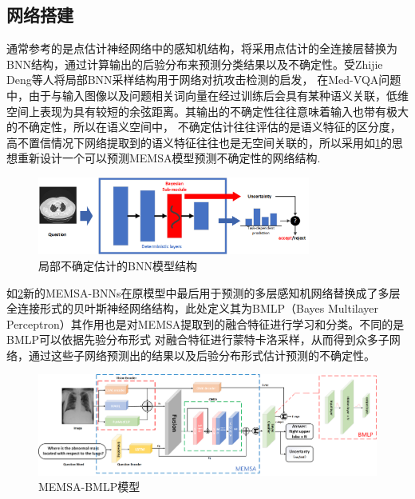 \subsection{网络搭建}
通常参考的是点估计神经网络中的感知机结构，将采用点估计的全连接层替换为BNN结构，通过计算输出的后验分布来预测分类结果以及不确定性。受Zhijie Deng等人\cite{deng2021libre}将局部BNN采样结构用于网络对抗攻击检测的启发，
在Med-VQA问题中，由于与输入图像以及问题相关词向量在经过训练后会具有某种语义关联，低维空间上表现为具有较短的余弦距离。其输出的不确定性往往意味着输入也带有极大的不确定性，所以在语义空间中，
不确定估计往往评估的是语义特征的区分度，高不置信情况下网络提取到的语义特征往往也是无空间关联的，所以采用如\ref{bnn-sublayer}的思想重新设计一个可以预测MEMSA模型预测不确定性的网络结构.
\begin{figure}[htbp]
	\centering	
	\includegraphics[width=0.8\textwidth]{Fig/myfig/chapter4/bnn-sublayer.png}  %
	\caption{\label{bnn-sublayer}局部不确定估计的BNN模型结构} 
\end{figure}

如\ref{memsabnns}新的MEMSA-BNNs在原模型中最后用于预测的多层感知机网络替换成了多层全连接形式的贝叶斯神经网络结构，此处定义其为BMLP（Bayes Multilayer Perceptron）其作用也是对MEMSA提取到的融合特征进行学习和分类。不同的是BMLP可以依据先验分布形式
对融合特征进行蒙特卡洛采样，从而得到众多子网络，通过这些子网络预测出的结果以及后验分布形式估计预测的不确定性。
\begin{figure}[htbp]
	\centering	
	\includegraphics[width=1\textwidth]{Fig/myfig/chapter4/memsabnns.png}  %
	\caption{\label{memsabnns}MEMSA-BMLP模型} 
\end{figure}
